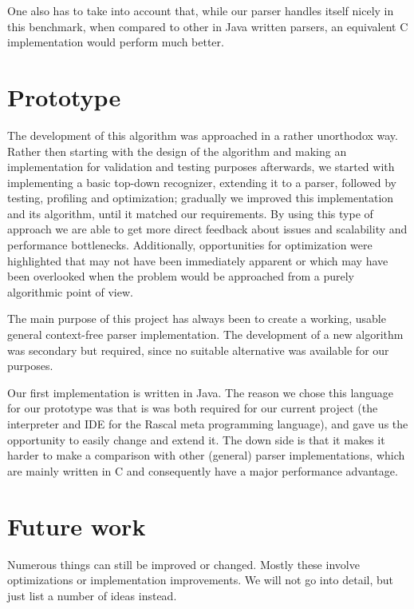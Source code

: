 \documentclass[a4paper,10pt]{article}
\begin{document}
One also has to take into account that, while our parser handles itself nicely in this benchmark, when compared to other in Java written parsers, an equivalent C implementation would perform much better.

\section{Prototype}

The development of this algorithm was approached in a rather unorthodox way. Rather then starting with the design of the algorithm and making an implementation for validation and testing purposes afterwards, we started with implementing a basic top-down recognizer, extending it to a parser, followed by testing, profiling and optimization; gradually we improved this implementation and its algorithm, until it matched our requirements. By using this type of approach we are able to get more direct feedback about issues and scalability and performance bottlenecks. Additionally, opportunities for optimization were highlighted that may not have been immediately apparent or which may have been overlooked when the problem would be approached from a purely algorithmic point of view.

The main purpose of this project has always been to create a working, usable general context-free parser implementation. The development of a new algorithm was secondary but required, since no suitable alternative was available for our purposes.

Our first implementation is written in Java. The reason we chose this language for our prototype was that is was both required for our current project (the interpreter and IDE for the Rascal\cite{klint2011easy} meta programming language), and gave us the opportunity to easily change and extend it. The down side is that it makes it harder to make a comparison with other (general) parser implementations, which are mainly written in C and consequently have a major performance advantage.

\section{Future work}

Numerous things can still be improved or changed. Mostly these involve optimizations or implementation improvements. We will not go into detail, but just list a number of ideas instead.
\end{document}
